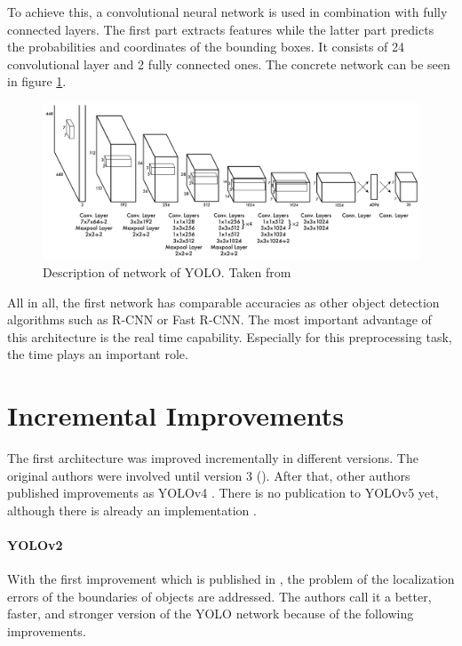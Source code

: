 To achieve this, a convolutional neural network is used in combination with fully connected layers. The first part extracts features while the latter part predicts the probabilities and coordinates of the bounding boxes. It consists of 24 convolutional layer and 2 fully connected ones. The concrete network can be seen in figure \ref{fig:YOLO_network}. \\


\begin{figure}[htb!]
	\centering
	\includegraphics[scale=0.28]{figures/YOLO_network.png}
	\caption{Description of network of YOLO. Taken from \cite{yolov1}}
	\label{fig:YOLO_network}
\end{figure}

All in all, the first network has comparable accuracies as other object detection algorithms such as R-CNN or Fast R-CNN. The most important advantage of this architecture is the real time capability. Especially for this preprocessing task, the time plays an important role. 

\section{Incremental Improvements}

The first architecture was improved incrementally in different versions. The original authors were involved until version 3 (\cite{yolov1, yolov2, yolov3}). After that, other authors published improvements as YOLOv4 \cite{yolov4}. There is no publication to YOLOv5 yet, although there is already an implementation \cite{yolov5}. \\

\paragraph{YOLOv2}
With the first improvement which is published in \cite{yolov2}, the problem of the localization errors of the boundaries of objects are addressed. The authors call it a better, faster, and stronger version of the YOLO network because of the following improvements.

